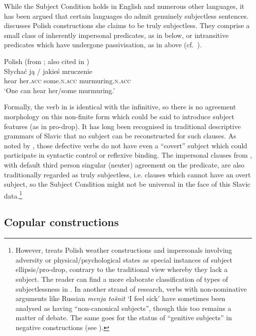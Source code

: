 \documentclass[output=paper,hidelinks]{langscibook}
\begin{document}
While the Subject Condition holds in English and numerous other languages, it has been argued that certain languages do admit genuinely subjectless sentences. \citet{Kibort2006,Kibort2012} discusses Polish constructions she claims to be truly subjectless. They comprise a small class of inherently impersonal predicates, as in  below, or intransitive predicates which have undergone passivisation, as in  above (cf.\ \citealt[22]{DLM:LFG}). 

\ea%
    \label{ex:Slavic:27}Polish (from \citealt{Kibort2006}; also cited in \citealt[22]{DLM:LFG})\\
    \gll Słycha\'{c}    ją / jakieś                 mruczenie\\
        hear         her.\textsc{acc} {}   some.\textsc{n.acc}      murmuring.\textsc{n.acc}\\
    \glt `One can hear her/some murmuring.' 
    \z

Formally, the verb in  is identical with the infinitive, so there is no agreement morphology on this non-finite form which could be said to introduce subject features (as in pro-drop). It has long been recognised in traditional descriptive grammars of Slavic that no subject can be reconstructed for such clauses. As noted by \citet[{\textsection}4.1]{Kibort2006}, those defective verbs do not have even a ``covert'' subject which could participate in syntactic control or reflexive binding. The impersonal clauses from , with default third person singular (neuter) agreement on the predicate, are also traditionally regarded as truly subjectless, i.e. clauses which cannot have an overt subject, so the Subject Condition might not be universal in the face of this Slavic data.\footnote{However, \citet{Kibort2006} treats Polish weather constructions and impersonals involving adversity or physical/psychological states as special instances of subject ellipsis/pro-drop, contrary to the traditional view whereby they lack a subject. The reader can find a more elaborate classification of types of subjectlessness in \citet{Kibort2006}. In another strand of research, verbs with non-nominative arguments like Russian \textit{menja tošnit} `I feel sick' have sometimes been analysed as having ``non-canonical subjects'', though this too remains a matter of debate. The same goes for the status of ``genitive subjects'' in negative constructions (see \citealt[868ff., with references]{Timberlake1993}).}

\subsection{Copular constructions}
\label{sec:Slavic:2.7}
\end{document}

